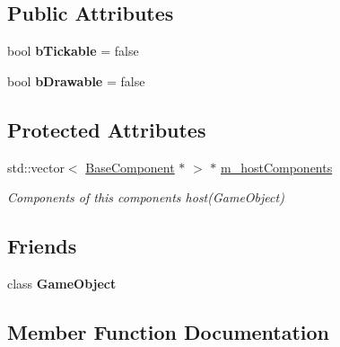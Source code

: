 \subsection*{Public Attributes}
\begin{DoxyCompactItemize}
\item 
\mbox{\label{classce_1_1game_1_1_base_component_a5bf4558535c84dc795d7815709cd3e5f}} 
bool {\bfseries b\+Tickable} = false
\item 
\mbox{\label{classce_1_1game_1_1_base_component_a3fcb89719c18c4675b2a09c564af86b4}} 
bool {\bfseries b\+Drawable} = false
\end{DoxyCompactItemize}
\subsection*{Protected Attributes}
\begin{DoxyCompactItemize}
\item 
std\+::vector$<$ \hyperlink{classce_1_1game_1_1_base_component}{Base\+Component} $\ast$ $>$ $\ast$ \hyperlink{classce_1_1game_1_1_base_component_ad0448e0b4026fbfee1f88b63ccfbd19c}{m\+\_\+host\+Components}
\begin{DoxyCompactList}\small\item\em Components of this components host(\+Game\+Object) \end{DoxyCompactList}\end{DoxyCompactItemize}
\subsection*{Friends}
\begin{DoxyCompactItemize}
\item 
\mbox{\label{classce_1_1game_1_1_base_component_a00df87c957d8f7ee0fc51f07a0542f4a}} 
class {\bfseries Game\+Object}
\end{DoxyCompactItemize}


\subsection{Member Function Documentation}
\mbox{\label{classce_1_1game_1_1_base_component_af359b12ae4a497e9b36f08286a3849dc}} 
